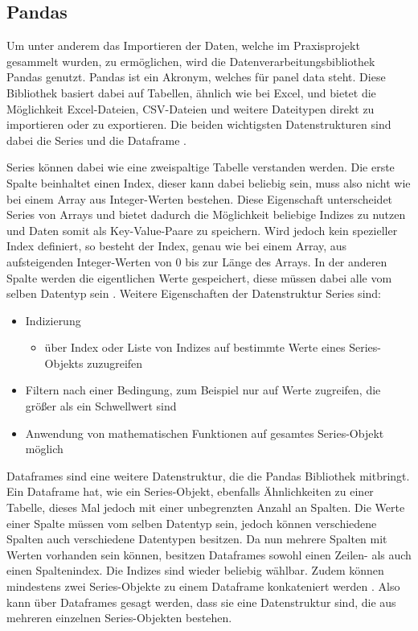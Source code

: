 \subsection{Pandas}

Um unter anderem das Importieren der Daten, welche im Praxisprojekt gesammelt wurden, zu ermöglichen, wird die Datenverarbeitungsbibliothek Pandas genutzt.
Pandas ist ein Akronym, welches für panel data steht. Diese Bibliothek basiert dabei auf Tabellen, ähnlich wie bei Excel, und bietet die Möglichkeit
Excel-Dateien, CSV-Dateien und weitere Dateitypen direkt zu importieren oder zu exportieren. Die beiden wichtigsten Datenstrukturen sind dabei die
Series und die Dataframe \cite[vgl. S.253]{NumerischesPython}. 

Series können dabei wie eine zweispaltige Tabelle verstanden werden. Die erste Spalte beinhaltet einen Index, dieser kann
dabei beliebig sein, muss also nicht wie bei einem Array aus Integer-Werten bestehen. Diese Eigenschaft unterscheidet Series von Arrays
und bietet dadurch die Möglichkeit beliebige Indizes zu nutzen und Daten somit als Key-Value-Paare zu speichern. Wird jedoch kein spezieller Index definiert,
so besteht der Index, genau wie bei einem Array, aus aufsteigenden Integer-Werten von 0 bis zur Länge des Arrays. In der anderen Spalte
werden die eigentlichen Werte gespeichert, diese müssen dabei alle vom selben Datentyp sein \cite[vgl. S.254f.]{NumerischesPython}. 
Weitere Eigenschaften der Datenstruktur Series sind:
\begin{itemize}
    \item Indizierung \cite[vgl. S.256]{NumerischesPython}
    \begin{itemize}
        \item über Index oder Liste von Indizes auf bestimmte Werte eines Series-Objekts zuzugreifen
    \end{itemize}
    \item Filtern nach einer Bedingung, zum Beispiel nur auf Werte zugreifen, die größer als ein Schwellwert sind \cite[vgl. S.256]{NumerischesPython}
    \item Anwendung von mathematischen Funktionen auf gesamtes Series-Objekt möglich \cite[vgl. S.256]{NumerischesPython}
\end{itemize}

Dataframes sind eine weitere Datenstruktur, die die Pandas Bibliothek mitbringt. Ein Dataframe hat, wie ein Series-Objekt, ebenfalls Ähnlichkeiten zu einer Tabelle,
dieses Mal jedoch mit einer unbegrenzten Anzahl an Spalten. Die Werte einer Spalte müssen vom selben Datentyp sein, jedoch können verschiedene Spalten 
auch verschiedene Datentypen besitzen. Da nun mehrere Spalten mit Werten vorhanden sein können, besitzen Dataframes sowohl einen Zeilen- als auch einen
Spaltenindex. Die Indizes sind wieder beliebig wählbar. Zudem können mindestens zwei Series-Objekte zu einem Dataframe
konkateniert werden \cite[vgl. S.263f.]{NumerischesPython}. Also kann über Dataframes gesagt werden, dass sie eine Datenstruktur sind, die aus mehreren einzelnen Series-Objekten bestehen.

